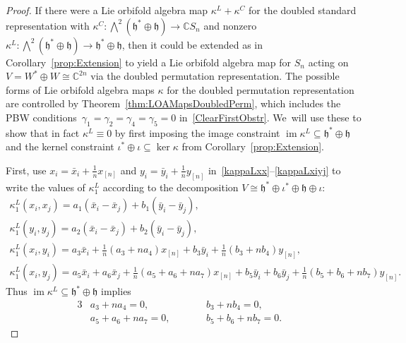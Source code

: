 \documentclass[pdftex]{sigma}
\numberwithin{equation}{section}
\newcommand{\n}[1]{{#1}_{[n]}}
\DeclareMathOperator{\im}{im}
\begin{document}
\begin{proof}
If there were a Lie orbifold algebra map $\kappa^L+\kappa^C$ for the
doubled standard representation with $\kappa^C\colon \bigwedge^2 (\mathfrak{h}^*\oplus\mathfrak{h}) \to \mathbb{C} S_n$
and nonzero $\kappa^L\colon \bigwedge^2 (\mathfrak{h}^*\oplus\mathfrak{h}) \to \mathfrak{h}^*\oplus\mathfrak{h}$, then
it could be extended as in Corollary~\ref{prop:Extension} to yield a
Lie orbifold algebra map for $S_n$ acting on $V=W^* \oplus W \cong \mathbb{C}^{2n}$ via
the doubled permutation representation. The possible forms of Lie orbifold algebra maps
$\kappa$ for the doubled permutation representation are controlled by Theorem~\ref{thm:LOAMapsDoubledPerm}, which includes the PBW conditions~$\gamma_1=\gamma_2=\gamma_4=\gamma_5=0$ in~\eqref{ClearFirstObstr}. We~will use these to show that in fact $\kappa^L\equiv 0$
by first imposing the image constraint $\im \kappa^L \subseteq \mathfrak{h}^*\oplus\mathfrak{h}$ and the kernel constraint $\iota^*\oplus\iota\subseteq\ker\kappa$
from Corollary~\ref{prop:Extension}.

First, use
$x_i=\bar{x}_i+\tfrac{1}{n}x_{[n]}$ and $y_i=\bar{y}_i+\tfrac{1}{n}y_{[n]}$
in~\eqref{kappaLxx}--\eqref{kappaLxiyj} to write the values of $\kappa^L_1$
according to the decomposition $V\cong\mathfrak{h}^* \oplus \iota^* \oplus \mathfrak{h} \oplus \iota$:
\begin{gather*}
\kappa^L_1(x_i,x_j)=a_1(\bar{x}_i-\bar{x}_j)+b_1(\bar{y}_i-\bar{y}_j), \\
\kappa^L_1(y_i,y_j)=a_2(\bar{x}_i-\bar{x}_j)+b_2(\bar{y}_i-\bar{y}_j), \\
\kappa^L_1(x_i,y_i)=a_3\bar{x}_i+\frac{1}{n}(a_3+na_4)\n{x}+b_3 \bar{y}_i+\frac{1}{n}(b_3+nb_4)\n{y}, \\
\kappa^L_1(x_i,y_j)=a_5 \bar{x}_i+a_6 \bar{x}_j+\frac{1}{n}(a_5+a_6+na_7)\n{x}+b_5 \bar{y}_i+b_6 \bar{y}_j+\frac{1}{n}(b_5+b_6+nb_7)\n{y}.
\end{gather*}
Thus $\im \kappa^L \subseteq \mathfrak{h}^*\oplus\mathfrak{h}$ implies
\begin{alignat*}{3}
& a_3+na_4=0, \qquad && b_3+nb_4=0,& \\
&a_5+a_6+na_7=0, \qquad && b_5+b_6+nb_7=0.&
\end{alignat*}


\end{proof}
\end{document}
